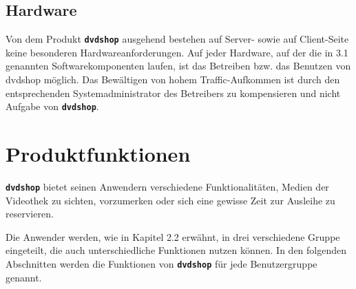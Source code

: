 \documentclass[12pt,oneside,a4paper,bibtotoc,liststotoc,pointlessnumbers]{scrartcl}
\begin{document}
\subsection{Hardware}
Von dem Produkt \texttt{\textbf{dvdshop}} ausgehend bestehen auf Server- sowie auf Client-Seite keine besonderen Hardwareanforderungen. Auf jeder Hardware, auf der die in 3.1 genannten Softwarekomponenten laufen, ist das Betreiben bzw. das Benutzen von dvdshop möglich. Das Bewältigen von hohem Traffic-Aufkommen ist durch den entsprechenden Systemadministrator des Betreibers zu kompensieren und nicht Aufgabe von \texttt{\textbf{dvdshop}}.

\newpage
\section{Produktfunktionen}
\texttt{\textbf{dvdshop}} bietet seinen Anwendern verschiedene Funktionalitäten, Medien der Videothek zu sichten, vorzumerken oder sich eine gewisse Zeit zur Ausleihe zu reservieren.\par
Die Anwender werden, wie in Kapitel 2.2 erwähnt, in drei verschiedene Gruppe eingeteilt, die auch unterschiedliche Funktionen nutzen können. In den folgenden Abschnitten werden die Funktionen von \texttt{\textbf{dvdshop}} für jede Benutzergruppe genannt.
\end{document}

